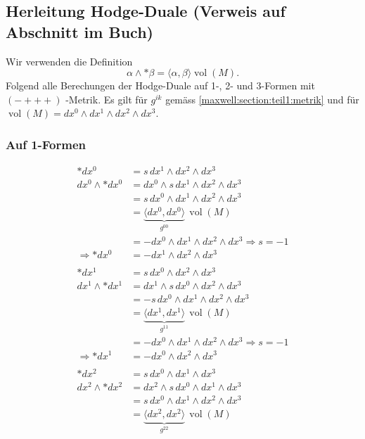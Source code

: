 \subsection{Herleitung Hodge-Duale (Verweis auf Abschnitt im Buch)}
Wir verwenden die Definition
$$\alpha \wedge \ast \beta = \langle \alpha, \beta \rangle \operatorname{vol}(M).$$
Folgend alle Berechungen der Hodge-Duale auf 1-, 2- und 3-Formen mit $(-+++)$ -Metrik.
Es gilt für $g^{ik}$ gemäss \eqref{maxwell:section:teil1:metrik} und für $ \operatorname{vol}(M) = dx^0 \wedge dx^1 \wedge dx^2 \wedge dx^3$.

\subsubsection{Auf 1-Formen}
\begin{align*}
	\ast dx^0 
	&=
	s \, dx^1 \wedge dx^2 \wedge dx^3
	\\
	dx^0 \wedge \ast dx^0 
	&=
	dx^0 \wedge s \, dx^1 \wedge dx^2 \wedge dx^3 
	\\
	&=
	s \, dx^0 \wedge dx^1 \wedge dx^2 \wedge dx^3
	\\
	&=
	\underbrace{\langle dx^0, dx^0 \rangle}_{g^{00}} \, \operatorname{vol}(M) 
	\\
	&= - dx^0 \wedge dx^1 \wedge dx^2 \wedge dx^3 \Rightarrow s = -1
	\\
	\Rightarrow \ast dx^0 
	&=
	- dx^1 \wedge dx^2 \wedge dx^3
\\
\\
	\ast dx^1 
	&=
	s \, dx^0 \wedge dx^2 \wedge dx^3
	\\
	dx^1 \wedge \ast dx^1 
	&=
	dx^1 \wedge s \, dx^0 \wedge dx^2 \wedge dx^3 
	\\
	&=
	-s \, dx^0 \wedge dx^1 \wedge dx^2 \wedge dx^3
	\\
	&=
	\underbrace{\langle dx^1, dx^1 \rangle}_{g^{11}} \, \operatorname{vol}(M) 
	\\
	&=
	- dx^0 \wedge dx^1 \wedge dx^2 \wedge dx^3 \Rightarrow s = -1
	\\
	\Rightarrow \ast dx^1 
	&=
	- dx^0 \wedge dx^2 \wedge dx^3
\\
\\
	\ast dx^2 
	&=
	s \, dx^0 \wedge dx^1 \wedge dx^3
	\\
	dx^2 \wedge \ast dx^2 
	&=
	dx^2 \wedge s \, dx^0 \wedge dx^1 \wedge dx^3 
	\\
	&=
	s \, dx^0 \wedge dx^1 \wedge dx^2 \wedge dx^3
	\\
	&=
	\underbrace{\langle dx^2, dx^2 \rangle}_{g^{22}} \, \operatorname{vol}(M) 

\end{align*}
